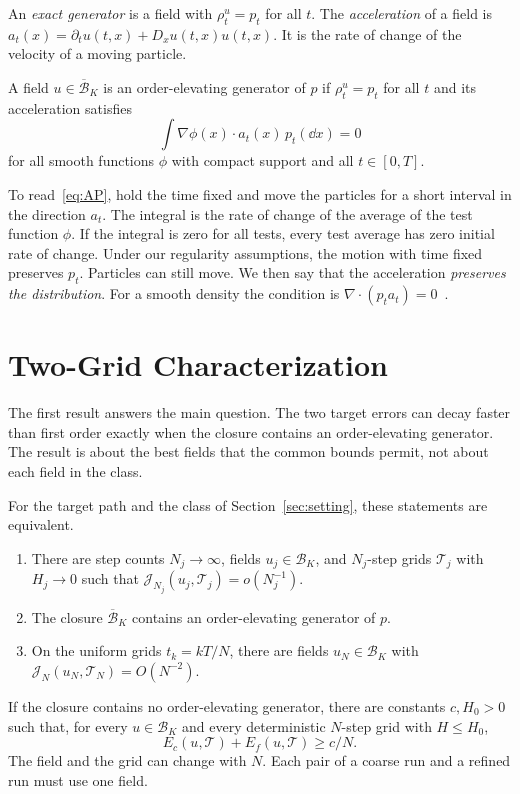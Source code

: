 An \emph{exact generator} is a field with $\rho_t^u=p_t$ for all $t$.
The \emph{acceleration} of a field is
$a_t(x)=\partial_tu(t,x)+D_xu(t,x)u(t,x)$. It is the rate of change of
the velocity of a moving particle.

\begin{definition}
A field $u\in\overline{\mathcal B}_K$ is an order-elevating generator of
$p$ if $\rho_t^u=p_t$ for all $t$ and its acceleration satisfies
\begin{equation}\label{eq:AP}
 \int\nabla\phi(x)\cdot a_t(x)\,p_t(\dd x)=0
\end{equation}
for all smooth functions $\phi$ with compact support and all
$t\in[0,T]$.
\end{definition}

To read~\eqref{eq:AP}, hold the time fixed and move the particles for a
short interval in the direction $a_t$. The integral is the rate of
change of the average of the test function $\phi$. If the integral is zero for all tests, every test average has zero
initial rate of change. Under our regularity assumptions, the motion
with time fixed preserves $p_t$. Particles can still move. We then say that the acceleration
\emph{preserves the distribution}. For a smooth density the condition is
$\nabla\cdot(p_ta_t)=0$~\citep{ambrosio2005gradient}.

\section{Two-Grid Characterization}
\label{sec:characterization}
The first result answers the main question. The two target errors can
decay faster than first order exactly when the closure contains an
order-elevating generator. The result is about the best fields that the
common bounds permit, not about each field in the class.\AIassistance

\begin{theorem}\label{thm:characterization}
For the target path and the class of Section~\ref{sec:setting}, these
statements are equivalent.
\begin{enumerate}
\item There are step counts $N_j\to\infty$, fields
 $u_j\in\mathcal B_K$, and $N_j$-step grids $\mathcal T_j$ with
 $H_j\to0$ such that $\mathcal J_{N_j}(u_j,\mathcal T_j)=o(N_j^{-1})$.
\item The closure $\overline{\mathcal B}_K$ contains an order-elevating
 generator of $p$.
\item On the uniform grids $t_k=kT/N$, there are fields
 $u_N\in\mathcal B_K$ with $\mathcal J_N(u_N,\mathcal T_N)=O(N^{-2})$.
\end{enumerate}
If the closure contains no order-elevating generator, there are
constants $c,H_0>0$ such that, for every $u\in\mathcal B_K$ and every
deterministic $N$-step grid with $H\le H_0$,
\begin{equation}\label{eq:general-uniform-barrier}
 E_c(u,\mathcal T)+E_f(u,\mathcal T)\ge c/N.
\end{equation}
The field and the grid can change with $N$. Each pair of a coarse run
and a refined run must use one field.
\end{theorem}

